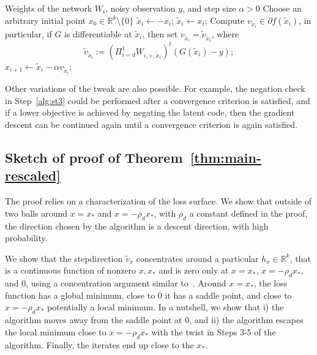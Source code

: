 \documentclass[11pt]{article}
\newcommand{\R}{\mathbb{R}}
\newcommand{\xo}{x_\ast}
\newcommand{\hx}{h_x}
\newcommand\stepdir[1]{\tilde v_{#1}}
\newcommand{\PiWditilde}{\Pi_{i=d}^1 W_{i,+,\tilde{x}_i}}
\newcommand{\whcomm}[2]{{\color{black} #1}{\color{black} #2}} %
\begin{document}
\begin{algorithm}[h!]
\caption{Gradient method}
\label{alg}
\begin{algorithmic}[1]
\REQUIRE Weights of the network $W_i$, noisy observation $y$, and step size $\alpha > 0$
\STATE Choose an arbitrary initial point $x_0 \in \mathbb{R}^k\setminus \{0\}$
  \label{alg:st3}
\STATE $\tilde{x}_{i} \gets - x_{i}$;
\ELSE
\STATE $\tilde{x}_i \gets x_i$;
\ENDIF
\STATE   Compute $v_{\tilde{x}_i} \in \partial f(\tilde{x}_i)$, in particular, if $G$ is differentiable at $\tilde{x}_i$, then set $v_{\tilde{x}_i} = \tilde{v}_{\tilde{x}_i}$,  where
$$
\tilde{v}_{\tilde{x}_i} := (\PiWditilde)^t (G(\tilde{x}_i) - y);
$$
\STATE $x_{i+1} \gets \tilde{x}_i - \alpha {v}_{\tilde{x}_i}$;
\ENDFOR
\end{algorithmic}
\end{algorithm}

Other variations of the tweak are also possible.  For example, the negation check in Step~\ref{alg:st3} could be performed after a convergence criterion is satisfied, and if a lower objective is achieved by negating the latent code, then the gradient descent can be continued again until a convergence criterion is again satisfied.







\subsection{Sketch of proof of Theorem~\ref{thm:main-rescaled}}

The proof relies on a characterization of the loss surface. 
We show that outside of two balls around $x = \xo$ and $x = - \rho_d \xo$, with $\rho_d$ a constant defined in the proof, the direction chosen by the algorithm is a descent direction, with high probability.

We show that the stepdirection $\stepdir{x}$ concentrates around a particular $\hx \in \R^k$, that is a continuous function of nonzero $x,\xo$ and is zero only at $x = \xo$, $x = - \rho_d \xo$, and $0$, using a concentration argument similar to~\citep{hand_global_2017}.
Around $x = \xo$, the loss function has a global minimum, close to $0$ it has a saddle point, and close to $x = - \rho_d \xo$
potentially a local minimum. 
In a nutshell, we show that 
i) the algorithm moves away from the saddle point at $0$, and
ii) the algorithm escapes the local minimum close to $x = - \rho_d \xo$ with the twist in Steps 3-5 of the algorithm. 
Finally, the iterates end up close to the $\xo$.
\end{document}
